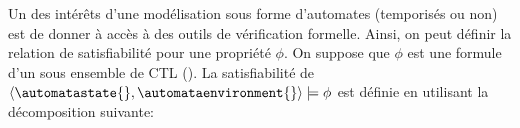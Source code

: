 
Un des intérêts d'une modélisation sous forme d'automates (temporisés ou non) est de donner à accès
à des outils de vérification formelle.
Ainsi, on peut définir la relation de satisfiabilité pour une
propriété $\phi$. On suppose que $\phi$ est une formule
d'un sous ensemble de CTL
(\cite{10.1145/567067.567080}).
La satisfiabilité de
$\langle \automatastate{}, \automataenvironment{} \rangle \models \phi$ est
définie en utilisant la décomposition suivante:

